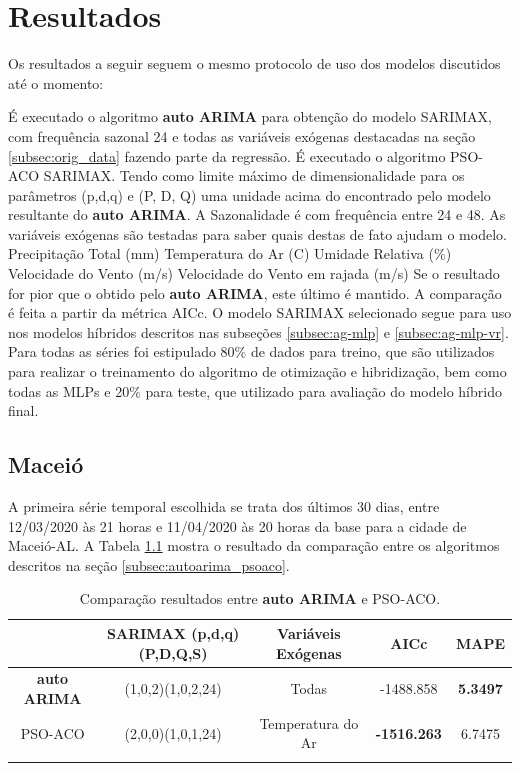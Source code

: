 \chapter{Resultados}
\label{cap:resultados}

Os resultados a seguir seguem o mesmo protocolo de uso dos modelos discutidos até o momento:

\begin{outline}[enumerate]
    \1 É executado o algoritmo \textbf{auto ARIMA} para obtenção do modelo SARIMAX, com frequência sazonal 24 e todas as variáveis exógenas destacadas na seção \ref{subsec:orig_data} fazendo parte da regressão.
    \1 É executado o algoritmo PSO-ACO SARIMAX.
        \2 Tendo como limite máximo de dimensionalidade para os parâmetros (p,d,q) e (P, D, Q) uma unidade acima do encontrado pelo modelo resultante do \textbf{auto ARIMA}.
        \2 A Sazonalidade é com frequência entre 24 e 48.
        \2 As variáveis exógenas são testadas para saber quais destas de fato ajudam o modelo.
            \3 Precipitação Total (mm)
            \3 Temperatura do Ar (\textdegree{}C)
            \3 Umidade Relativa (\%)
            \3 Velocidade do Vento (m/s)
            \3 Velocidade do Vento em rajada (m/s)
        \2 Se o resultado for pior que o obtido pelo \textbf{auto ARIMA}, este último é mantido. A comparação é feita a partir da métrica AICc.
    \1 O modelo SARIMAX selecionado segue para uso nos modelos híbridos descritos nas subseções \ref{subsec:ag-mlp} e \ref{subsec:ag-mlp-vr}.
        \2 Para todas as séries foi estipulado 80\% de dados para treino, que são utilizados para realizar o treinamento do algoritmo de otimização e hibridização, bem como todas as MLPs e 20\% para teste, que utilizado para avaliação do modelo híbrido final.
\end{outline}

\section{Maceió}

A primeira série temporal escolhida se trata dos últimos 30 dias, entre 12/03/2020 às 21 horas e 11/04/2020 às 20 horas da base para a cidade de Maceió-AL. A Tabela \ref{tab:cap4_comp_autoarima_psoaco} mostra o resultado da comparação entre os algoritmos descritos na seção \ref{subsec:autoarima_psoaco}. 

\begin{table}[htbp]
\caption{Comparação resultados entre \textbf{auto ARIMA} e PSO-ACO.}
\begin{center}
\begin{tabular}{ccccc}
                    & SARIMAX (p,d,q)(P,D,Q,S) & Variáveis Exógenas & AICc & MAPE  \\\hline
\textbf{auto ARIMA} & (1,0,2)(1,0,2,24) & Todas & -1488.858 & \textbf{5.3497} \\\hline
PSO-ACO             & (2,0,0)(1,0,1,24) & Temperatura do Ar & \textbf{-1516.263} & 6.7475 \\\hline
\label{tab:cap4_comp_autoarima_psoaco}
\end{tabular}
\end{center}
\end{table}

